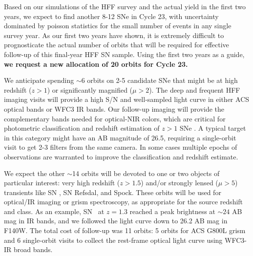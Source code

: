 \documentclass[12pt]{article}
\begin{document}
Based on our simulations of the HFF survey and the actual yield in the
first two years, we expect to find another 8-12 SNe in Cycle 23, with
uncertainty dominated by poisson statistics for the small number of
events in any single survey year.  As our first two years have shown,
it is extremely difficult to prognosticate the actual number of orbits
that will be required for effective follow-up of this final-year HFF
SN sample.  Using the first two years as a guide, {\bf we request a new
allocation  of 20 orbits for Cycle 23.}

We anticipate spending $\sim$6 orbits on 2-5 candidate SNe that might
be at high redshift ($z>1$) or significantly magnified ($\mu>2$).  The
deep and frequent HFF imaging visits will provide a high S/N and
well-sampled light curve in either ACS optical bands or WFC3 IR bands.
Our follow-up imaging will provide the complementary bands needed for
optical-NIR colors, which are critical for photometric classification
and redshift estimation of $z>1$ SNe \citep{Riess:2004a,Rodney:2012}.
A typical target in this category might have an AB magnitude of 26.5,
requiring a single-orbit visit to get 2-3 filters from the same
camera.  In some cases multiple epochs of observations are warranted
to improve the classification and redshift estimate.

We expect the other $\sim$14 orbits will be devoted to one or two
objects of particular interest: very high redshift ($z>1.5$) and/or
strongly lensed ($\mu>5$) transients like SN \tomas, SN Refsdal, and
Spock.  These orbits will be used for optical/IR imaging or grism
spectroscopy, as appropriate for the source redshift and class.  As an
example, SN \tomas\ at $z=1.3$ reached a peak brightness at $\sim24$
AB mag in IR bands, and we followed the light curve down to 26.2 AB mag
in F140W.  The total cost of follow-up was 11 orbits: 5 orbits for ACS
G800L grism and 6 single-orbit visits to collect the rest-frame
optical light curve using WFC3-IR broad bands.





\end{document}
